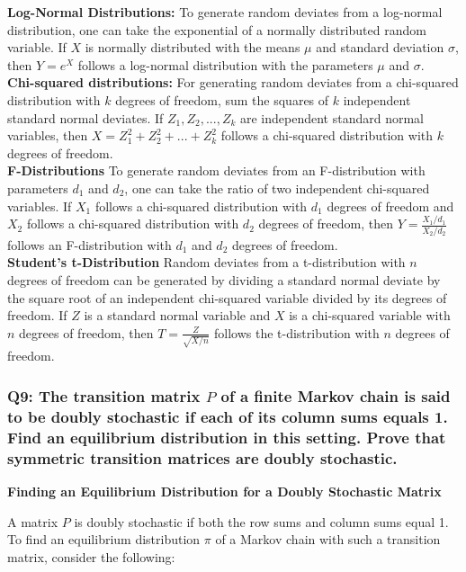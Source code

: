 \documentclass[8pt]{article}
\begin{document}
\textbf{Log-Normal Distributions:}
To generate random deviates from a log-normal distribution, one can take the exponential of a normally distributed random variable. If $X$ is normally distributed with the means $\mu$ and standard deviation $\sigma$, then $Y = e^{X}$ follows a log-normal distribution with the parameters $\mu$ and $\sigma$. \\ 

\textbf{Chi-squared distributions:} For generating random deviates from a chi-squared distribution with $k$
degrees of freedom, sum the squares of $k$ independent standard normal deviates. If $Z_1, Z_2,...,Z_k$ are independent standard normal variables, then $X = Z_1^2 +  Z_2^2+...+Z_k^2$ follows a chi-squared distribution with $k$ degrees of freedom. \\

\textbf{F-Distributions} To generate random deviates from an F-distribution with parameters $d_1$ and $d_2$, one can take the ratio of two independent chi-squared variables. If $X_1$ follows a chi-squared distribution with $d_1$ degrees of freedom and $X_2$ follows a chi-squared distribution with $d_2$ degrees of freedom, then $Y = \frac{X_1/d_1}{X_2/d_2}$ follows an F-distribution with $d_1$ and $d_2$ degrees of freedom. \\

\textbf{Student's t-Distribution} Random deviates from a t-distribution with $n$ degrees of freedom can be generated by dividing a standard normal deviate by the square root of an independent chi-squared variable divided by its degrees of freedom. If $Z$ is a standard normal variable and $X$ is a chi-squared variable with $n$ degrees of freedom, then $T= \frac{Z}{\sqrt{X/n}}$ follows the t-distribution with $n$ degrees of freedom. \\

\subsubsection*{Q9:
The transition matrix \(P\) of a finite Markov chain is said to be doubly stochastic if each of its column sums equals 1. Find an equilibrium distribution in this setting. Prove that symmetric transition matrices are doubly stochastic.}

\textbf{Finding an Equilibrium Distribution for a Doubly Stochastic Matrix}

A matrix \(P\) is doubly stochastic if both the row sums and column sums equal 1. To find an equilibrium distribution \(\pi\) of a Markov chain with such a transition matrix, consider the following:
\end{document}
